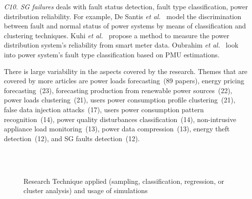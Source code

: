 \documentclass[journal]{IEEEtran}
\begin{document}
\textit{C10. SG failures} deals with fault status detection, fault type classification, power distribution reliability. For example, De Santis \textit{et al.}~ model the discrimination between fault and normal status of power systems by means of classification and clustering techniques. Kuhi \textit{et al.}~ propose a method to measure the power distribution system's reliability from smart meter data. Oubrahim \textit{et al.}~ look into power system's fault type classification based on PMU estimations.


There is large variability in the aspects covered by the research. Themes that are covered by more articles are power loads forecasting~(89 papers), energy pricing forecasting~(23), forecasting production from renewable power sources~(22), power loads clustering~(21), users power consumption profile clustering~(21), false data injection attacks~(17), users power consumption pattern recognition~(14), power quality disturbances classification~(14), non-intrusive appliance load monitoring~(13), power data compression~(13), energy theft detection~(12), and SG faults detection~(12).


\begin{figure*}[htbp!]
      \renewcommand{\thesubfigure}{C1}
      \renewcommand{\thesubfigure}{C2}
     \renewcommand{\thesubfigure}{C3}
     \renewcommand{\thesubfigure}{C4}
   \\ 
        
  \renewcommand{\thesubfigure}{C5}
  \renewcommand{\thesubfigure}{C6}
  \renewcommand{\thesubfigure}{C7}
  \renewcommand{\thesubfigure}{C8}
   \\ 
          \renewcommand{\thesubfigure}{C9}
  \renewcommand{\thesubfigure}{C10}
        \renewcommand{\thesubfigure}{All}
  \caption{Research Technique applied (sampling, classification, regression, or cluster analysis) and usage of simulations}
  \label{fig:empirical-technique} 
\end{figure*}
\end{document}
